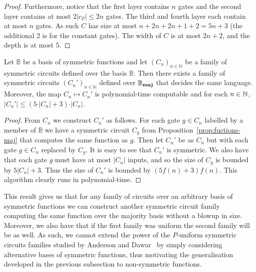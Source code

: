 \documentclass[../paper.tex]{subfiles}
\begin{document}
\begin{proof}
  Furthermore, notice that the first layer contains $n$ gates and the second
  layer contains at most $2 \vert c_{F} \vert \leq 2n$ gates. The third and
  fourth layer each contain at most $n$ gates. As such $C$ has size at most $n +
  2n + 2n + 1 + 2 = 5n +3$ (the additional 2 is for the constant gates). The
  width of $C$ is at most $2n + 2$, and the depth is at most $5$.
\end{proof}

\begin{thm}
  Let $\mathbb{B}$ be a basis of symmetric functions and let $(C_n)_{n \in
    \mathbb{N}}$ be a family of symmetric circuits defined over the basis
  $\mathbb{B}$. Then there exists a family of symmetric circuits $(C_n')_{n \in
    \mathbb{N}}$ defined over $\mathbb{B}_{\text{\textbf{maj}}}$ that decides the same language.
  Moreover, the map $C_n \mapsto C_n'$ is polynomial-time computable and for
  each $n \in \mathbb{N}$, $\vert C_n' \vert \leq (5 \cdot \vert C_n \vert + 3) \cdot
  \vert C_n \vert$.
\end{thm}

\begin{proof}
  From $C_n$ we construct $C_n'$ as follows. For each gate $g \in C_n$ labelled
  by a member of $\mathbb{B}$ we have a symmetric circuit $C_g$ from
  Proposition~\ref{prop:fuctions-maj} that computes the same function as $g$.
  Then let $C_n'$ be as $C_n$ but with each gate $g \in C_n$ replaced by $C_g$.
  It is easy to see that $C_n'$ is symmetric. We also have that each gate $g$
  must have at most $\vert C_n \vert$ inputs, and so the size of $C_g$ is
  bounded by $5 \vert C_n \vert + 3$. Thus the size of $C_n'$ is bounded by
  $(5f(n)+3) f(n)$. This algorithm clearly runs in polynomial-time.
\end{proof}

This result gives us that for any family of circuits over an arbitrary basis of
symmetric functions we can construct another symmetric circuit family computing
the same function over the majority basis without a blowup in size. Moreover, we
also have that if the first family was uniform the second family will be as
well. As such, we cannot extend the power of the $P$-uniform symmetric circuits
families studied by Anderson and Dawar~\cite{AndersonD17} by simply considering
alternative bases of symmetric functions, thus motivating the generalisation
developed in the previous subsection to non-symmetric functions.
\end{document}
